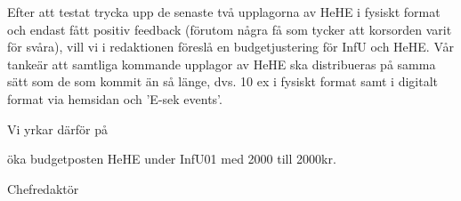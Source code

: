 \documentclass[../_main/handlingar.tex]{subfiles}
\begin{document}

Efter att testat trycka upp de senaste två upplagorna av HeHE i fysiskt format
och endast fått positiv feedback (förutom några få som tycker att korsorden varit
för svåra), vill vi i redaktionen föreslå en budgetjustering för InfU och HeHE.
Vår tankeär att samtliga kommande upplagor av HeHE ska distribueras på
samma sätt som de som kommit än så länge, dvs. 10 ex i fysiskt format samt i
digitalt format via hemsidan och 'E-sek events'. 

Vi yrkar därför på
\begin{attsatser}
    \att öka budgetposten HeHE under InfU01 med 2000 till 2000kr.
\end{attsatser}

\begin{signatures}{1}
    \mvh 
    \signature{Max Mauritsson}{Chefredaktör}
\end{signatures}
\end{document}
